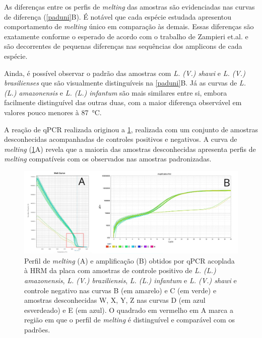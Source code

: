 As diferenças entre os perfis de \textit{melting} das amostras são evidenciadas
nas curvas de diferença (\cref{paduni}B).  É notável que cada espécie estudada
apresentou comportamento de \textit{melting} único em comparação às demais.
Essas diferenças são exatamente conforme o esperado de acordo com o trabalho de
Zampieri et.al.\cite{HRMzampi2016} e são decorrentes de pequenas diferenças nas
sequências dos amplicons de cada espécie.

Ainda, é possível observar o padrão das amostras com \textit{L. (V.) shawi} e
\textit{L. (V.) brasilienses} que são visualmente distinguíveis na
\cref{paduni}B. Já as curvas de \textit{L. (L.) amazonensis} e \textit{L. (L.)
infantum} são mais similares entre si, embora facilmente distinguível das outras
duas,  com a maior diferença observável em valores pouco menores à
\qty{87}{\celsius}.

A reação de qPCR realizada originou a \cref{tstuni}, realizada com um conjunto
de amostras desconhecidas acompanhadas de controles positivos e negativos. A
curva de \textit{melting} (\cref{tstuni}A) revela que a maioria das amostras
desconhecidas apresenta perfis de \textit{melting} compatíveis com os observados
nas amostras padronizadas.

\begin{figure}[h]
        \centering
        \includegraphics[width=.9\textwidth]{fig/prancheta_test_PCR}
        \caption{Perfil de \textit{melting} (A) e amplificação (B) obtidos por
            qPCR acoplada à HRM da placa com amostras de controle positivo de \textit{L. (L.)
        amazonensis}, \textit{L. (V.) braziliensis},
    \textit{L. (L.) infantum} e \textit{L. (V.) shawi} e controle negativo nas
    curvas B (em amarelo) e C (em verde) e amostras desconhecidas W, X, Y, Z nas
    curvas D (em azul esverdeado) e E (em azul). O quadrado em vermelho em A
    marca a região em que o perfil de \textit{melting} é distinguível e
    comparável com os padrões.
}
        \label{tstuni}
\end{figure}

